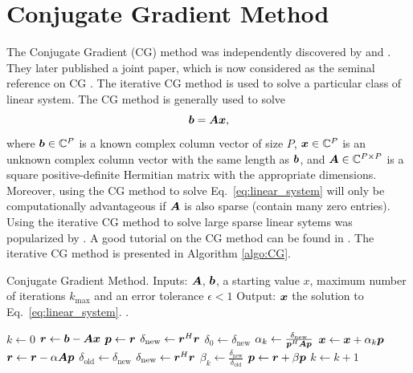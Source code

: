 \documentclass[useAMS,usenatbib]{mn2e}
\newcommand{\bA}{\bmath{A}}
\newcommand{\br}{\bmath{r}}
\newcommand{\bb}{\bmath{b}}
\newcommand{\bx}{\bmath{x}}
\newcommand{\bp}{\bmath{p}}
\begin{document}
\section{Conjugate Gradient Method}
The Conjugate Gradient (CG) method was independently discovered by \citet{Hestenes1973} and \citet{Stiefel1952}. They later published a joint paper, which is now considered as the seminal
reference on CG \citep{Hestenes1952}. The iterative CG method is used to solve a particular class of linear system. The CG method is generally used to solve
\begin{equation}
\label{eq:linear_system}
\bb = \bA\bx,
\end{equation}
where $\bb\in\mathbb{C}^P$ is a known complex column vector of size $P$, $\bx\in\mathbb{C}^P$ is an unknown complex column vector with the same length as $\bb$, and $\bA\in\mathbb{C}^{P\times P}$ is a square positive-definite Hermitian matrix with the appropriate dimensions.  
Moreover, using the CG method to solve Eq.~\eqref{eq:linear_system} will only be computationally advantageous if $\bA$ is also sparse (contain many zero entries).
Using the iterative CG method to solve large sparse linear sytems was popularized by \citet{Reid1971}. A good tutorial on the CG method can be found in \citep{Shewchuk1994}.
The iterative CG method is presented in Algorithm \ref{algo:CG}. 


\begin{algorithm}
\caption{Conjugate Gradient Method. Inputs: $\bA$, $\bb$, a starting value $x$, maximum number of iterations $k_{\textrm{max}}$ and an error tolerance $\epsilon<1$ Output: $\bx$ the solution to Eq.~\eqref{eq:linear_system}. \citep{Shewchuk1994}.}\label{algo:CG}
\begin{algorithmic}[1]
\State $k \gets 0$
\State $\br \gets \bb - \bA\bx$
\State $\bp \gets \br$
\State $\delta_{\textrm{new}} \gets \br^H\br$
\State $\delta_0 \gets \delta_{\textrm{new}}$
\State $\alpha_k \gets \frac{\delta_{\textrm{new}}}{\bp^H\bA\bp}$
\State $\bx \gets \bx + \alpha_k\bp$
\State $\br \gets \br - \alpha\bA\bp$
\State $\delta_{\textrm{old}} \gets \delta_{\textrm{new}}$ 
\State $\delta_{\textrm{new}} \gets \br^H\br$
\State $\beta_{k} \gets \frac{\delta_{\textrm{new}}}{\delta_{\textrm{old}}}$
\State $\bp \gets \br + \beta\bp$
\State $k \gets k + 1$
\EndWhile
\end{algorithmic}
\end{algorithm}
\end{document}
